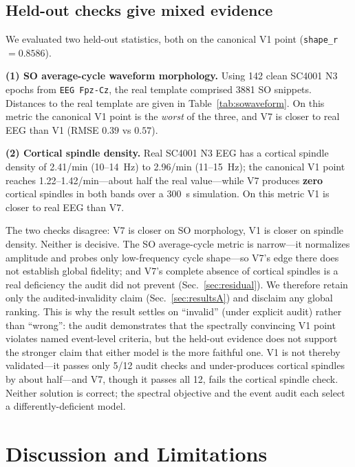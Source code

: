 \documentclass[conference]{IEEEtran}
\newcommand{\code}[1]{\texttt{#1}}
\begin{document}
\subsection{Held-out checks give mixed evidence}\label{sec:resultsD}
We evaluated two held-out statistics, both on the canonical V1 point
(\code{shape\_r}~$=0.8586$).

\textbf{(1) SO average-cycle waveform morphology.} Using 142 clean SC4001 N3
epochs from \code{EEG Fpz-Cz}, the real template comprised 3881 SO snippets.
Distances to the real template are given in Table~\ref{tab:sowaveform}. On this
metric the canonical V1 point is the \emph{worst} of the three, and V7 is closer
to real EEG than V1 (RMSE $0.39$ vs $0.57$).

\textbf{(2) Cortical spindle density.} Real SC4001 N3 EEG has a cortical spindle
density of 2.41/min (10--14~Hz) to 2.96/min (11--15~Hz); the canonical V1 point
reaches 1.22--1.42/min---about half the real value---while V7 produces
\textbf{zero} cortical spindles in both bands over a 300~s simulation. On this
metric V1 is closer to real EEG than V7.

The two checks disagree: V7 is closer on SO morphology, V1 is closer on spindle
density. Neither is decisive. The SO average-cycle metric is narrow---it
normalizes amplitude and probes only low-frequency cycle shape---so V7's edge
there does not establish global fidelity; and V7's complete absence of cortical
spindles is a real deficiency the audit did not prevent
(Sec.~\ref{sec:residual}). We therefore retain only the audited-invalidity
claim (Sec.~\ref{sec:resultsA}) and disclaim any global ranking. This is why the
result settles on ``invalid'' (under explicit audit) rather than ``wrong'': the
audit demonstrates that the spectrally convincing V1 point violates named
event-level criteria, but the held-out evidence does not support the stronger
claim that either model is the more faithful one. V1 is not thereby
validated---it passes only 5/12 audit checks and under-produces cortical
spindles by about half---and V7, though it passes all 12, fails the cortical
spindle check. Neither solution is correct; the spectral objective and the event
audit each select a differently-deficient model.

\section{Discussion and Limitations}
\end{document}
